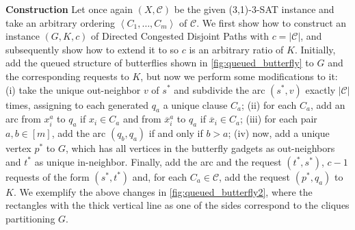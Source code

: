 \documentclass[a4paper,UKenglish,cleveref, autoref, thm-restate]{lipics-v2021}
\newcommand{\angled}[1]{\left\langle{#1}\right\rangle}
\newcommand{\pname}[1]{{\sc #1}}
\newcommand{\ol}[1]{\overline{#1}}
\newcommand{\congestion}{c}
\begin{document}
\noindent\textbf{Construction} Let once again $(X, \mathcal{C})$ be the given
\pname{(3,1)-3-SAT} instance and take an arbitrary ordering $\angled{C_1, \dots, C_m}$ of
$\mathcal{C}$.
We first show how to construct an instance $(G, K, \congestion)$ of \pname{Directed
Congested Disjoint Paths} with $\congestion = |\mathcal{C}|$, and subsequently show how
to extend it to so $\congestion$ is an arbitrary ratio of $K$.
Initially, add the queued structure of butterflies shown in
\autoref{fig:queued_butterfly} to $G$ and the corresponding requests to $K$, but now
we perform some modifications to it:
(i) take the unique out-neighbor $v$ of $s^*$ and subdivide the arc $(s^*, v)$ exactly
$|\mathcal{C}|$ times, assigning to each generated $q_a$ a unique clause $C_a$;
(ii) for each $C_a$, add an arc from $x_i^a$ to $q_a$ if  $x_i \in C_a$ and from
$\ol{x}_i^a$ to $q_a$ if $\ol{x}_i \in C_a$;
(iii) for each pair $a,b \in [m]$, add the arc $(q_b, q_a)$ if and only if $b > a$;
(iv) now, add a unique vertex $p^*$ to $G$, which has all vertices in the
butterfly gadgets as out-neighbors and $t^*$ as unique in-neighbor.
Finally, add the arc and the request $(t^*, s^*)$, $\congestion-1$ requests of the form
$(s^*, t^*)$ and, for each $C_a \in \mathcal{C}$, add the request $(p^*, q_a)$ to $K$.
We exemplify the above changes in \autoref{fig:queued_butterfly2}, where the
rectangles with the thick vertical line as one of the sides correspond to the cliques
partitioning $G$.
\end{document}
